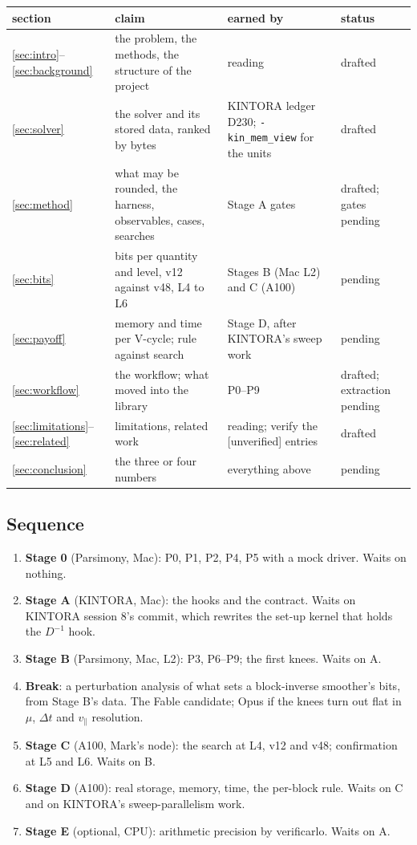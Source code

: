 \documentclass[11pt]{article}
\newcommand{\vpar}{v_\parallel}
\newcommand{\code}[1]{\texttt{#1}}
\begin{document}
\begin{center}
\footnotesize
\begin{tabularx}{\linewidth}{@{}l>{\raggedright}X>{\raggedright}p{3.3cm}>{\raggedright\arraybackslash}p{2.0cm}@{}}
\toprule
section & claim & earned by & status \\
\midrule
\ref{sec:intro}--\ref{sec:background} & the problem, the methods, the structure of the project & reading & drafted \\
\ref{sec:solver} & the solver and its stored data, ranked by bytes & KINTORA ledger D230; \code{-kin\_mem\_view} for the units & drafted \\
\ref{sec:method} & what may be rounded, the harness, observables, cases, searches & Stage A gates & drafted; gates pending \\
\ref{sec:bits} & bits per quantity and level, v12 against v48, L4 to L6 & Stages B (Mac L2) and C (A100) & pending \\
\ref{sec:payoff} & memory and time per V-cycle; rule against search & Stage D, after KINTORA's sweep work & pending \\
\ref{sec:workflow} & the workflow; what moved into the library & P0--P9 & drafted; extraction pending \\
\ref{sec:limitations}--\ref{sec:related} & limitations, related work & reading; verify the [unverified] entries & drafted \\
\ref{sec:conclusion} & the three or four numbers & everything above & pending \\
\bottomrule
\end{tabularx}
\end{center}

\subsection{Sequence}

\begin{enumerate}
  \item \textbf{Stage 0} (Parsimony, Mac): P0, P1, P2, P4, P5 with a mock driver.  Waits on nothing.
  \item \textbf{Stage A} (KINTORA, Mac): the hooks and the contract.  Waits on KINTORA session 8's
    commit, which rewrites the set-up kernel that holds the $D^{-1}$ hook.
  \item \textbf{Stage B} (Parsimony, Mac, L2): P3, P6--P9; the first knees.  Waits on A.
  \item \textbf{Break}: a perturbation analysis of what sets a block-inverse smoother's bits, from
    Stage B's data.  The Fable candidate; Opus if the knees turn out flat in $\mu$, $\Delta t$ and
    $\vpar$ resolution.
  \item \textbf{Stage C} (A100, Mark's node): the search at L4, v12 and v48; confirmation at L5 and
    L6.  Waits on B.
  \item \textbf{Stage D} (A100): real storage, memory, time, the per-block rule.  Waits on C and on
    KINTORA's sweep-parallelism work.
  \item \textbf{Stage E} (optional, CPU): arithmetic precision by verificarlo.  Waits on A.
\end{enumerate}
\end{document}

